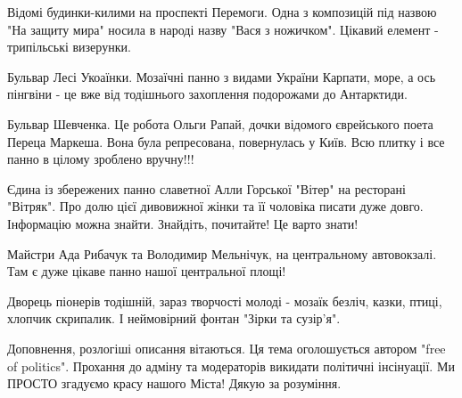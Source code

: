 Відомі будинки-килими на проспекті Перемоги. Одна з композицій під назвою "На
защиту мира" носила в народі назву "Вася з ножичком". Цікавий елемент -
трипільські визерунки.

Бульвар Лесі Укоаїнки. Мозаїчні панно з видами України Карпати, море, а ось
пінгвіни - це вже від тодішнього захоплення подорожами до Антарктиди.

Бульвар Шевченка. Це робота Ольги Рапай, дочки відомого єврейського поета
Переца Маркеша. Вона була репресована, повернулась у Київ. Всю плитку і все
панно в цілому зроблено вручну!!!

Єдина із збережених панно славетної Алли Горської "Вітер" на ресторані
"Вітряк". Про долю цієї дивовижної жінки та її чоловіка писати дуже довго.
Інформацію можна знайти. Знайдіть, почитайте! Це варто знати!

Майстри Ада Рибачук та Володимир Мельнічук, на центральному автовокзалі. Там є
дуже цікаве панно нашої центральної площі!

Дворець піонерів тодішній, зараз творчості молоді - мозаїк безліч, казки,
птиці, хлопчик скрипалик. І неймовірний фонтан "Зірки та сузір'я".

Доповнення, розлогіші описання вітаються. Ця тема оголошується автором "free of
politics". Прохання до адміну та модераторів викидати політичні інсінуації. Ми
ПРОСТО згадуємо красу нашого Міста! Дякую за розуміння.
